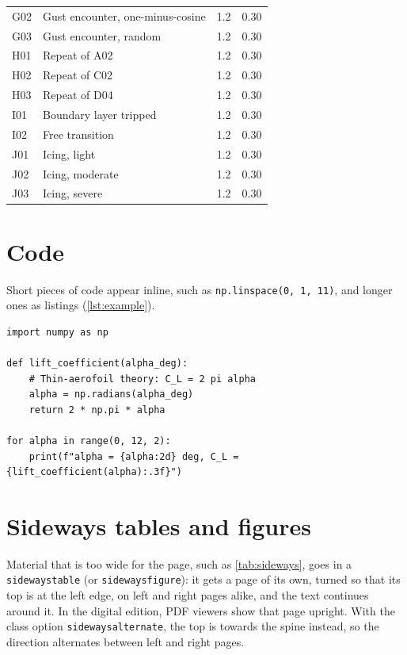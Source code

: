 \begin{xltabular}{\textwidth}{@{}l X S[table-format=1.1] S[table-format=1.2]@{}}
    G02 & Gust encounter, one-minus-cosine & 1.2 & 0.30 \\
    G03 & Gust encounter, random & 1.2 & 0.30 \\
    H01 & Repeat of A02 & 1.2 & 0.30 \\
    H02 & Repeat of C02 & 1.2 & 0.30 \\
    H03 & Repeat of D04 & 1.2 & 0.30 \\
    I01 & Boundary layer tripped & 1.2 & 0.30 \\
    I02 & Free transition & 1.2 & 0.30 \\
    J01 & Icing, light & 1.2 & 0.30 \\
    J02 & Icing, moderate & 1.2 & 0.30 \\
    J03 & Icing, severe & 1.2 & 0.30 \\
\end{xltabular}

\section{Code}\label{sec:code}

Short pieces of code appear inline, such as \lstinline{np.linspace(0, 1, 11)}, and longer ones as listings (\cref{lst:example}).

\begin{lstlisting}[caption={Computing the lift coefficient from thin-aerofoil theory.}, label={lst:example}]
import numpy as np

def lift_coefficient(alpha_deg):
    # Thin-aerofoil theory: C_L = 2 pi alpha
    alpha = np.radians(alpha_deg)
    return 2 * np.pi * alpha

for alpha in range(0, 12, 2):
    print(f"alpha = {alpha:2d} deg, C_L = {lift_coefficient(alpha):.3f}")
\end{lstlisting}

\section{Sideways tables and figures}\label{sec:sideways}

Material that is too wide for the page, such as \cref{tab:sideways}, goes in a \texttt{sidewaystable} (or \texttt{sidewaysfigure}): it gets a page of its own, turned so that its top is at the left edge, on left and right pages alike, and the text continues around it. In the digital edition, PDF viewers show that page upright. With the class option \texttt{sidewaysalternate}, the top is towards the spine instead, so the direction alternates between left and right pages.

